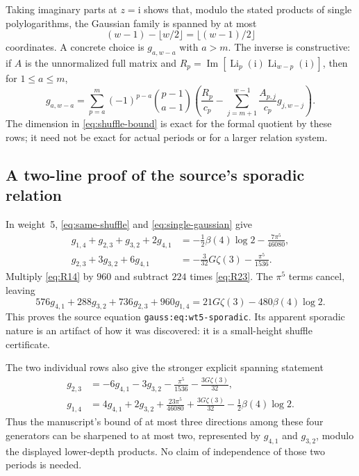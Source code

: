 \documentclass[11pt,a4paper]{article}
\numberwithin{equation}{section}
\theoremstyle{definition}
\theoremstyle{remark}
\newcommand{\Li}{\operatorname{Li}}
\newcommand{\Imag}{\operatorname{Im}}
\newcommand{\ii}{\mathrm{i}}
\begin{document}
Taking imaginary parts at $z=\ii$ shows that, modulo the stated products of single polylogarithms, the Gaussian family is spanned by at most
\begin{equation}\label{eq:shuffle-bound}
 (w-1)-\lfloor w/2\rfloor=\lfloor(w-1)/2\rfloor
\end{equation}
coordinates. A concrete choice is $g_{a,w-a}$ with $a>m$. The inverse is constructive: if $A$ is the unnormalized full matrix and $R_p=\Imag[\Li_p(\ii)\Li_{w-p}(\ii)]$, then for $1\le a\le m$,
\begin{equation}\label{eq:shuffle-solve}
 g_{a,w-a}=\sum_{p=a}^m(-1)^{p-a}\binom{p-1}{a-1}
 \left(\frac{R_p}{c_p}-\sum_{j=m+1}^{w-1}\frac{A_{p,j}}{c_p}g_{j,w-j}\right).
\end{equation}
The dimension in \eqref{eq:shuffle-bound} is exact for the formal quotient by these rows; it need not be exact for actual periods or for a larger relation system.

\subsection{A two-line proof of the source's sporadic relation}
In weight~5, \eqref{eq:same-shuffle} and \eqref{eq:single-gaussian} give
\begin{align}
 g_{1,4}+g_{2,3}+g_{3,2}+2g_{4,1}
 &=-\frac12\beta(4)\log2-\frac{7\pi^5}{46080},\label{eq:R14}\\
 g_{2,3}+3g_{3,2}+6g_{4,1}
 &=-\frac{3}{32}G\zeta(3)-\frac{\pi^5}{1536}.\label{eq:R23}
\end{align}
Multiply \eqref{eq:R14} by $960$ and subtract $224$ times \eqref{eq:R23}. The $\pi^5$ terms cancel, leaving
\begin{equation}\label{eq:wt5-proved}
 576g_{4,1}+288g_{3,2}+736g_{2,3}+960g_{1,4}
 =21G\zeta(3)-480\beta(4)\log2.
\end{equation}
This proves the source equation \texttt{gauss:eq:wt5-sporadic}. Its apparent sporadic nature is an artifact of how it was discovered: it is a small-height shuffle certificate.

The two individual rows also give the stronger explicit spanning statement
\begin{align}
 g_{2,3}&=-6g_{4,1}-3g_{3,2}-\frac{\pi^5}{1536}
                           -\frac{3G\zeta(3)}{32},\label{eq:g23-reduce}\\
 g_{1,4}&=4g_{4,1}+2g_{3,2}+\frac{23\pi^5}{46080}
                      +\frac{3G\zeta(3)}{32}-\frac12\beta(4)\log2.
 \label{eq:g14-reduce}
\end{align}
Thus the manuscript's bound of at most three directions among these four generators can be sharpened to at most two, represented by $g_{4,1}$ and $g_{3,2}$, modulo the displayed lower-depth products. No claim of independence of those two periods is needed.
\end{document}
